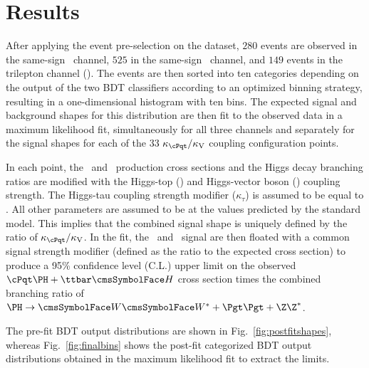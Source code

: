 \section{Results}\label{sec:results}
After applying the event pre-selection on the dataset, $280$ events are observed in the same-sign \mumu\ channel, $525$ in the same-sign \emu\ channel, and $149$ events in the trilepton channel (\threel).
The events are then sorted into ten categories depending on the output of the two BDT classifiers according to an optimized binning strategy, resulting in a one-dimensional histogram with ten bins.
The expected signal and background shapes for this distribution are then fit to the observed data in a maximum likelihood fit, simultaneously for all three channels and separately for the signal shapes for each of the 33 $\Ct/\CV$ coupling configuration points.

In each point, the \tH\ and \ttH\ production cross sections and the Higgs decay branching ratios are modified with the Higgs-top (\Ct) and Higgs-vector boson (\CV) coupling strength.
The Higgs-tau coupling strength modifier ($\kappa_\tau$) is assumed to be equal to \Ct.
All other parameters are assumed to be at the values predicted by the standard model.
This implies that the combined signal shape is uniquely defined by the ratio of $\Ct/\CV$.
In the fit, the \tH\ and \ttH\ signal are then floated with a common signal strength modifier (defined as the ratio to the expected cross section) to produce a 95\% confidence level (C.L.) upper limit on the observed $\tH+\ttH$ cross section times the combined branching ratio of $\PH\to\W\W^*+\tautau+\Z\Z^*$.

The pre-fit BDT output distributions are shown in Fig.~\ref{fig:postfitshapes}, whereas Fig.~\ref{fig:finalbins} shows the post-fit categorized BDT output distributions obtained in the maximum likelihood fit to extract the limits.

